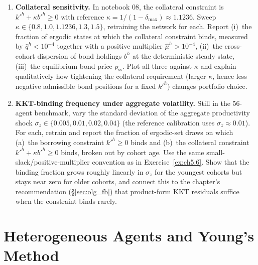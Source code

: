 \documentclass[11pt,a4paper]{report}
\begin{document}
\begin{enumerate}[itemsep=4pt, leftmargin=*]
\item\label{ex:ch5:6} \textbf{Collateral sensitivity.}  In notebook 08, the collateral constraint is $k'^h + \kappa b'^h \ge 0$ with reference $\kappa = 1/(1-\delta_{\max}) \approx 1.1236$.  Sweep $\kappa \in \{0.8, 1.0, 1.1236, 1.3, 1.5\}$, retraining the network for each.  Report (i)~the fraction of ergodic states at which the collateral constraint binds, measured by $\hat q^h < 10^{-4}$ together with a positive multiplier $\hat\mu^h > 10^{-4}$, (ii)~the cross-cohort dispersion of bond holdings $b^h$ at the deterministic steady state, (iii)~the equilibrium bond price $p_\mathrm{ss}$.  Plot all three against $\kappa$ and explain qualitatively how tightening the collateral requirement (larger $\kappa$, hence less negative admissible bond positions for a fixed $k'^h$) changes portfolio choice.
\item\label{ex:ch5:7} \textbf{KKT-binding frequency under aggregate volatility.}  Still in the 56-agent benchmark, vary the standard deviation of the aggregate productivity shock $\sigma_z \in \{0.005, 0.01, 0.02, 0.04\}$ (the reference calibration uses $\sigma_z \approx 0.01$).  For each, retrain and report the fraction of ergodic-set draws on which (a)~the borrowing constraint $k'^h \ge 0$ binds and (b)~the collateral constraint $k'^h + \kappa b'^h \ge 0$ binds, broken out by cohort age.  Use the same small-slack/positive-multiplier convention as in Exercise~\ref{ex:ch5:6}.  Show that the binding fraction grows roughly linearly in $\sigma_z$ for the youngest cohorts but stays near zero for older cohorts, and connect this to the chapter's recommendation (\S\ref{sec:olg_fb}) that product-form KKT residuals suffice when the constraint binds rarely.
\end{enumerate}


\chapter{Heterogeneous Agents and Young's Method}
\label{ch:young}
\end{document}
